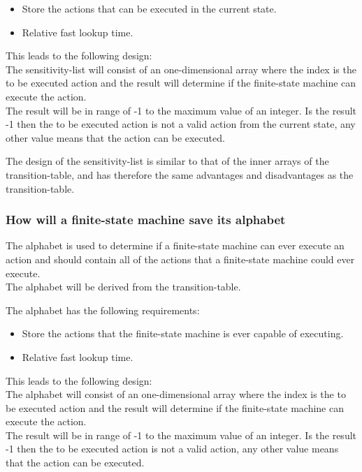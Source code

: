 \begin{itemize}
\tightlist
\item
  Store the actions that can be executed in the current state.
\item
  Relative fast lookup time.
\end{itemize}

This leads to the following design:\\
The sensitivity-list will consist of an one-dimensional array where the
index is the to be executed action and the result will determine if the
finite-state machine can execute the action.\\
The result will be in range of -1 to the maximum value of an integer. Is
the result -1 then the to be executed action is not a valid action from
the current state, any other value means that the action can be
executed.

The design of the sensitivity-list is similar to that of the inner
arrays of the transition-table, and has therefore the same advantages
and disadvantages as the transition-table.

\hypertarget{how-will-a-finite-state-machine-save-its-alphabet}{%
\subsubsection{How will a finite-state machine save its
alphabet}\label{how-will-a-finite-state-machine-save-its-alphabet}}

The alphabet is used to determine if a finite-state machine can ever
execute an action and should contain all of the actions that a
finite-state machine could ever execute.\\
The alphabet will be derived from the transition-table.

The alphabet has the following requirements:

\begin{itemize}
\tightlist
\item
  Store the actions that the finite-state machine is ever capable of
  executing.
\item
  Relative fast lookup time.
\end{itemize}

This leads to the following design:\\
The alphabet will consist of an one-dimensional array where the index is
the to be executed action and the result will determine if the
finite-state machine can execute the action.\\
The result will be in range of -1 to the maximum value of an integer. Is
the result -1 then the to be executed action is not a valid action, any
other value means that the action can be executed.

